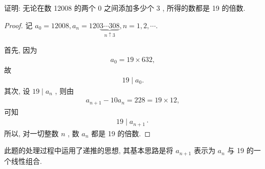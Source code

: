\begin{example}
	证明: 无论在数 12008 的两个 0 之间添加多少个 3 , 所得的数都是 19 的倍数.
\end{example}
\begin{proof}
	记 $a_{0}=12008, a_{n}=120 \underbrace{3 \cdots 308}_{n \uparrow 3}, n=1,2, \cdots$.

	首先, 因为
	\begin{align*}
		a_{0}=19 \times 632,
	\end{align*}
	故
	\begin{align*}
		19 \mid a_{0}.
	\end{align*}
	其次, 设 $19 \mid a_{n}$ , 则由
	\begin{align*}
		a_{n+1}-10 a_{n}=228=19 \times 12,
	\end{align*}
	可知
	\begin{align*}
		19 \mid a_{n+1} \cdot
	\end{align*}
	所以, 对一切整数 $n$ , 数 $a_{n}$ 都是 19 的倍数.
\end{proof}
\begin{note}
	此题的处理过程中运用了递推的思想, 其基本思路是将 $a_{n+1}$ 表示为 $a_{n}$ 与 19 的一个线性组合.
\end{note}

